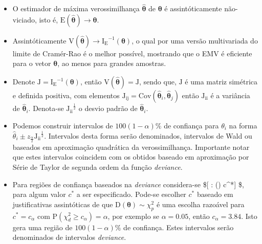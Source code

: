 \documentclass[
  9pt,
  a5paper,
]{book}
\providecommand{\tightlist}{%
  \setlength{\itemsep}{0pt}\setlength{\parskip}{0pt}}
\theoremstyle{definition}
\theoremstyle{definition}
\theoremstyle{definition}
\theoremstyle{definition}
\theoremstyle{remark}
\begin{document}
\begin{itemize}
\tightlist
\item
  O estimador de máxima verossimilhança \(\hat{\boldsymbol{\theta}}\) de \(\boldsymbol{\theta}\) é assintóticamente não-viciado, isto é, \(\mathrm{E}(\hat{\boldsymbol{\theta}}) \to \boldsymbol{\theta}\).
\item
  Assintóticamente \(\mathrm{V}(\hat{\boldsymbol{\theta}}) \to \mathrm{I_E}^{-1}(\boldsymbol{\theta})\), o qual por uma versão multivariada do limite de Cramér-Rao é o melhor possível, mostrando que o EMV é eficiente para o vetor \(\boldsymbol{\theta}\), ao menos para grandes amostras.
\item
  Denote \(\mathrm{J} = \mathrm{I_E}^{-1}(\boldsymbol{\theta})\), então \(\mathrm{V}(\hat{\boldsymbol{\theta}}) = \mathrm{J}\), sendo que, \(\mathrm{J}\) é uma matriz simétrica e definida positiva, com elementos \(\mathrm{J_{ij}} = \mathrm{Cov}(\hat{\boldsymbol{\theta}}_i, \hat{\boldsymbol{\theta}}_j)\) então \(\mathrm{J_{ii}}\) é a variância de \(\hat{\boldsymbol{\theta}}_i\).
  Denota-se \(\mathrm{J_{ii}}^{\frac{1}{2}}\) o desvio padrão de \(\hat{\boldsymbol{\theta}}_i\).
\item
  Podemos construir intervalos de \(100(1-\alpha)\%\) de confiança para \(\theta_i\) na forma \(\hat{\theta}_i \pm z_{\frac{\alpha}{2}} \mathrm{J_{ii}}^{\frac{1}{2}}\). Intervalos desta forma serão denominados, intervalos de Wald ou baseados em aproximação quadrática da verossimilhança. Importante notar que estes intervalos coincidem com os obtidos baseado em aproximação por Série de Taylor de segunda ordem da função \emph{deviance}.
\item
  Para regiões de confiança baseados na \emph{deviance} considera-se \${[} \boldsymbol{\theta} \in \Theta : (\boldsymbol{\theta}) \leq c\^{}*{]} \$, para algum valor \(c^*\) a ser especificado. Pode-se escolher \(c^*\) baseado em justificativas assintóticas de que \(\mathrm{D}(\boldsymbol{\theta}) \sim \chi^2_p\) é uma escolha razoável para \(c^* = c_{\alpha}\) com \(\mathrm{P}(\chi^2_d \ge c_{\alpha}) = \alpha\), por exemplo se \(\alpha = 0.05\), então \(c_{\alpha} = 3.84\). Isto gera uma região de \(100(1 - \alpha)\%\) de confiança. Estes intervalos serão denominados de intervalos \emph{deviance}.
\end{itemize}
\end{document}
